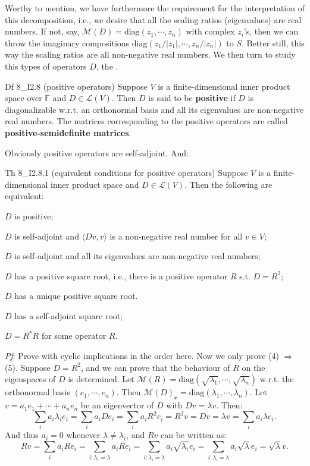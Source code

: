 \documentclass{article}
\begin{document}
Worthy to mention, we have furthermore the requirement for the interpretation of this decomposition, i.e., we desire that all the scaling ratios (eigenvalues) are real numbers. If not, say, $\mathcal{M}(D) = \text{diag}(z_1, \cdots, z_n)$ with complex $z_i$'s, then we can throw the imaginary compositions $\text{diag}(z_1/|z_1|, \cdots, z_n/|z_n|)$ to $S$. Better still, this way the scaling ratios are all non-negative real numbers. We then turn to study this types of operators $D$, the .

\begin{Df}{Df 8\_I2.8 (positive operators)}
    Suppose $V$ is a finite-dimensional inner product space over $\mathbb{F}$ and $D\in\mathcal{L}(V)$. Then $D$ is said to be \textbf{positive} if $D$ is diagonalizable w.r.t. an orthonormal basis and all its eigenvalues are non-negative real numbers. The matrices corresponding to the positive operators are called \textbf{positive-semidefinite matrices}.
\end{Df}

Obviously \textcolor{Th}{positive operators are self-adjoint.} And:
\begin{Th}{Th 8\_I2.8.1 (equivalent conditions for positive operators)}
    Suppose $V$ is a finite-dimensional inner product space and $D\in\mathcal{L}(V)$. Then the following are equivalent:
    \begin{compactenum}
        \item $D$ is positive;
        \item $D$ is self-adjoint and $\langle Dv, v\rangle$ is a non-negative real number for all $v\in V$;
        \item $D$ is self-adjoint and all its eigenvalues are non-negative real numbers;
        \item $D$ has a positive square root, i.e., there is a positive operator $R$ s.t. $D = R^2$;
        \item $D$ has a unique positive square root.
        \item $D$ has a self-adjoint square root;
        \item $D = R^\ast R$ for some operator $R$.
    \end{compactenum}
    \tcblower
    \textit{Pf}: Prove with cyclic implications in the order here. Now we only prove (4) $\Rightarrow$ (5). Suppose $D = R^2$, and we can prove that the behaviour of $R$ on the eigenspaces of $D$ is determined. Let $\mathcal{M}(R) = \text{diag}(\sqrt{\lambda_1},\cdots,\sqrt{\lambda_n})$ w.r.t. the orthonormal basis $(e_1, \cdots, e_n)$. Then $\mathcal{M}(D)_{\pmb{e}} = \text{diag}(\lambda_1, \cdots, \lambda_n)$. Let $v = a_1e_1+\cdots+a_ne_n$ be an eigenvector of $D$ with $Dv = \lambda v$. Then:
    $$ \sum_{i} a_i\lambda_ie_i = \sum_{i}a_iDe_i = \sum_{i}a_iR^2e_i = R^2v = Dv = \lambda v = \sum_{i}a_i\lambda e_i. $$
    And thus $a_i = 0$ whenever $\lambda \neq \lambda_i$, and $Rv$ can be written as:
    $$ Rv = \sum_{i} a_iRe_i = \sum_{i: \lambda_i = \lambda} a_iRe_i = \sum_{i: \lambda_i = \lambda} a_i\sqrt{\lambda_i}e_i = \sum_{i:\lambda_i = \lambda} a_i\sqrt{\lambda}e_i = \sqrt{\lambda}v. $$ 
\end{Th}
\end{document}
